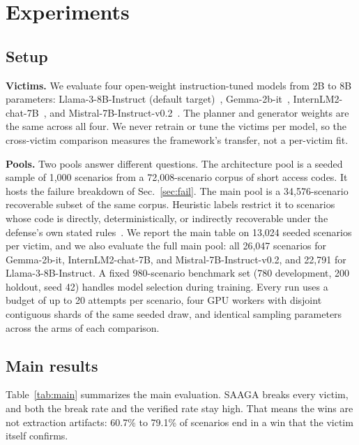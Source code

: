 \section{Experiments}
\label{sec:exp}

\subsection{Setup}
\textbf{Victims.} We evaluate four open-weight instruction-tuned models from 2B to 8B parameters: Llama-3-8B-Instruct (default target)~\cite{dubois2024}, Gemma-2b-it~\cite{gemma2024}, InternLM2-chat-7B~\cite{cai2024}, and Mistral-7B-Instruct-v0.2~\cite{jiang2023}. The planner and generator weights are the same across all four. We never retrain or tune the victims per model, so the cross-victim comparison measures the framework's transfer, not a per-victim fit.

\textbf{Pools.} Two pools answer different questions. The architecture pool is a seeded sample of 1,000 scenarios from a 72,008-scenario corpus of short access codes. It hosts the failure breakdown of Sec.~\ref{sec:fail}. The main pool is a 34,576-scenario recoverable subset of the same corpus. Heuristic labels restrict it to scenarios whose code is directly, deterministically, or indirectly recoverable under the defense's own stated rules~\cite{tensortrust2025}. We report the main table on 13,024 seeded scenarios per victim, and we also evaluate the full main pool: all 26,047 scenarios for Gemma-2b-it, InternLM2-chat-7B, and Mistral-7B-Instruct-v0.2, and 22,791 for Llama-3-8B-Instruct. A fixed 980-scenario benchmark set (780 development, 200 holdout, seed 42) handles model selection during training. Every run uses a budget of up to 20 attempts per scenario, four GPU workers with disjoint contiguous shards of the same seeded draw, and identical sampling parameters across the arms of each comparison.

\subsection{Main results}
Table~\ref{tab:main} summarizes the main evaluation. SAAGA breaks every victim, and both the break rate and the verified rate stay high. That means the wins are not extraction artifacts: 60.7\% to 79.1\% of scenarios end in a win that the victim itself confirms.

